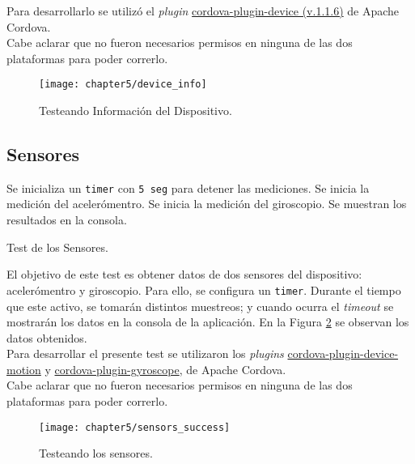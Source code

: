 Para desarrollarlo se utilizó el \textit{plugin} \href{https://www.npmjs.com/package/cordova-plugin-device}{cordova-plugin-device (v.1.1.6)} de Apache Cordova.\\

Cabe aclarar que no fueron necesarios permisos en ninguna de las dos plataformas para poder correrlo.
\begin{figure}[hbtp]
   \centering
	\texttt{[image: chapter5/device\_info]}
	\caption{Testeando Información del Dispositivo.}
	\label{fig:ch05:device-info}
\end{figure}
\subsection{Sensores}
\begin{algorithm}
	\begin{algorithmic}[1]
		\STATE Se inicializa un \texttt{timer} con \texttt{5 seg} para detener las mediciones.
		\STATE Se inicia la medición del acelerómentro.
		\STATE Se inicia la medición del giroscopio.
		\STATE Se muestran los resultados en la consola.
	\end{algorithmic}
	\caption{Test de los Sensores.}\label{alg:chap5_test_sensors}
\end{algorithm}
El objetivo de este test es obtener datos de dos sensores del dispositivo: acelerómentro y giroscopio. Para ello, se configura un \texttt{timer}. Durante el tiempo que este activo, se tomarán distintos muestreos; y cuando ocurra el \emph{timeout} se mostrarán los datos en la consola de la aplicación. En la Figura \ref{fig:ch05:sensors_test} se observan los datos obtenidos.\\

Para desarrollar el presente test se utilizaron los \textit{plugins} \href{https://www.npmjs.com/package/cordova-plugin-device-motion}{cordova-plugin-device-motion} y \href{https://www.npmjs.com/package/cordova-plugin-gyroscope}{cordova-plugin-gyroscope}, de Apache Cordova.\\

Cabe aclarar que no fueron necesarios permisos en ninguna de las dos plataformas para poder correrlo.
\begin{figure}[tp]
    \centering
	\texttt{[image: chapter5/sensors\_success]}
	\caption{Testeando los sensores.}
	\label{fig:ch05:sensors_test}
\end{figure}


